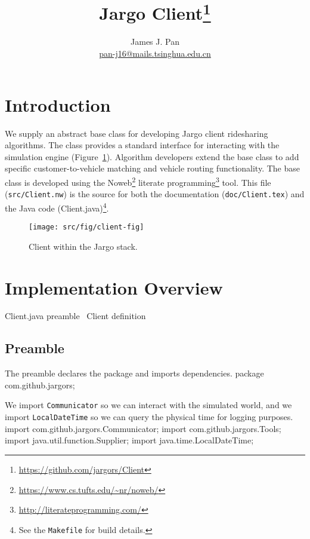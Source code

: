 \documentclass{article}
\title{Jargo Client\footnote{
    \url{https://github.com/jargors/Client}}}
\author{James J. Pan\\
  \small{\href{mailto:pan-j16@mails.tsinghua.edu.cn}{pan-j16@mails.tsinghua.edu.cn}}}
\def\nwendcode{\endtrivlist \endgroup}      %
\let\nwdocspar=\par
\begin{document}
\maketitle
\pagestyle{noweb}

\tableofcontents

\section{Introduction}
\label{sec:introduction}
We supply an abstract base class for developing Jargo client ridesharing
algorithms. The class provides a standard interface for interacting with the
simulation engine (Figure~\ref{fig:client}). Algorithm developers extend the
base class to add specific customer-to-vehicle matching and vehicle routing
functionality.  The base class is developed using the
Noweb\footnote{\url{https://www.cs.tufts.edu/~nr/noweb/}} literate
programming\footnote{\url{http://literateprogramming.com/}} tool.  This file
({\tt{}src/Client.nw}) is the source for both the documentation
({\tt{}doc/Client.tex}) and the Java code (Client.java)\footnote{See the
{\tt{}Makefile} for build details.}.

\begin{figure}[h]
\centering
\texttt{[image: src/fig/client-fig]}
\caption{Client within the Jargo stack.}
\label{fig:client}
\end{figure}

\section{Implementation Overview}
\endmoddef{}
\LA{}Client.java preamble~{\nwtagstyle{}}\RA{}
\LA{}\code{}Client\edoc{} definition~{\nwtagstyle{}}\RA{}
\nwendcode{}\nwdocspar

\subsection{Preamble}
The preamble declares the package and imports dependencies.
\nwenddocs{}\endmoddef{}
package com.github.jargors;
\nwendcode{}\nwdocspar
We import {\tt{}Communicator} so we can interact with the simulated world,
and we import {\tt{}LocalDateTime} so we can query the physical time for
logging purposes.
\nwenddocs{}\plusendmoddef
import com.github.jargors.Communicator;
import com.github.jargors.Tools;
import java.util.function.Supplier;
import java.time.LocalDateTime;
\nwendcode{}\nwdocspar
\end{document}

